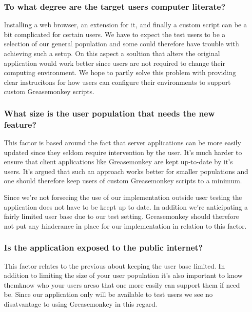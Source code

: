 \subsubsection{To what degree are the target users computer literate?}

Installing a web browser, an extension for it, and finally a custom script
can be a bit complicated for certain users. We have to expect the
test users to be a selection of our general population and some could
therefore have trouble with achieving such a setup. On this aspect
a soultion that alters the original application would work better
since users are not required to change their computing environment.
We hope to partly solve this problem with providing clear instrucitons
for how users can configure their environments to support custom
Greasemonkey scripts.

\subsubsection{What size is the user population that needs the new feature?}

This factor is based around the fact that server applications can be more
easily updated since they seldom require intervention by the user. It's
much harder to ensure that client applications like Greasemonkey are
kept up-to-date by it's users. It's argued that such an approach works
better for smaller populations and one should therefore keep users
of custom Greasemonkey scripts to a minimum.

Since we're not forseeing the use of our implementation outside user
testing the application does not have to be keept up to date. In addition
we're anticipating a fairly limited user base due to our test setting.
Greasemonkey should therefore not put any hinderance in place for
our implementation in relation to this factor.

\subsubsection{Is the application exposed to the public internet?}

This factor relates to the previous about keeping the user base limited.
In addition to limiting the size of your user population it's also
important to know them\dash{}know who your users are\dash{}so that
one more easily can support them if need be. Since our application
only will be available to test users we see no disatvantage to
using Greasemonkey in this regard.

